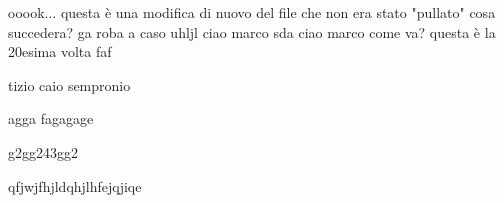 \usepackage{pdfcomment}


    ooook... questa è una modifica di nuovo del file che non era stato "pullato" cosa succedera?
ga    roba a caso 
uhljl
ciao marco sda
ciao marco come va? questa è la 20esima volta 
    faf
    

    tizio caio
    sempronio

    agga
    fagagage


    g2gg243gg2







    qfjwjfhjldqhjlhfejqjiqe
